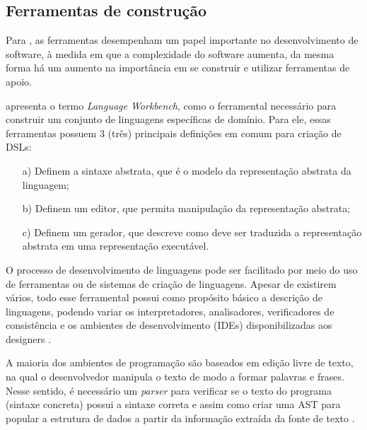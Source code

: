 \newpage
\subsection{Ferramentas de construção}
\label{ferramentasdsl}

Para , as ferramentas desempenham um papel importante no desenvolvimento de software, à medida em que a complexidade do software aumenta, da mesma forma há um aumento na importância em se construir e utilizar ferramentas de apoio.

 apresenta o termo \textit{Language Workbench}, como o ferramental necessário para construir um conjunto de linguagens específicas de domínio. Para ele, essas ferramentas possuem 3 (três) principais definições em comum para criação de \gls{DSL}s:

\begin{enumerate}
    \item[a)] Definem a sintaxe abstrata, que é o modelo da representação abstrata da linguagem;
    \item[b)] Definem um editor, que permita manipulação da representação abstrata;
    \item[c)] Definem um gerador, que descreve como deve ser traduzida a representação abstrata em uma representação executável.
\end{enumerate}

O processo de desenvolvimento de linguagens pode ser facilitado por meio do uso de ferramentas ou de sistemas de criação de linguagens. Apesar de existirem vários, todo esse ferramental possui como propósito básico a descrição de linguagens, podendo variar os interpretadores, analisadores, verificadores de consistência e os ambientes de desenvolvimento (\gls{IDE}s) disponibilizadas aos designers \cite{mernik2005and}. 

\begin{citacao}


A maioria dos ambientes de programação são baseados em edição livre de texto, na qual o desenvolvedor manipula o texto de modo a formar palavras e frases. Nesse sentido, é necessário um \textit{parser} para verificar se o texto do programa (sintaxe concreta) possui a sintaxe correta e assim como criar uma \gls{AST} para popular a estrutura de dados a partir da informação extraída da fonte de texto  \cite[p.179,tradução nossa]{dslengineering}.

\end{citacao}


